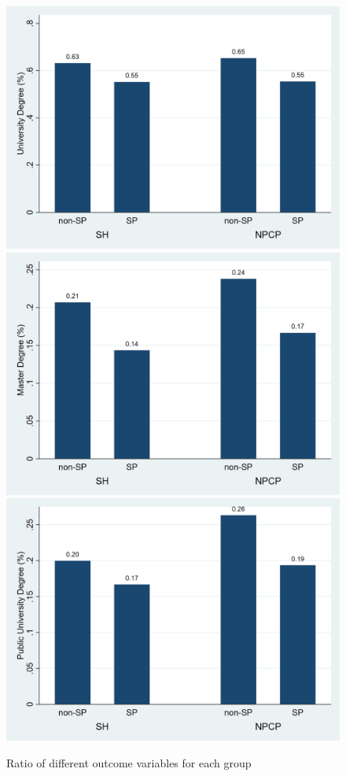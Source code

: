\documentclass[]{AEA}
\begin{document}
    \begin{figure}
        \caption{Ratio of different outcome variables for each group}
        \includegraphics[scale=0.13]{university_sp.png}
        \includegraphics[scale=0.13]{master_sp.png}
        \includegraphics[scale=0.13]{public_sp.png}
    \end{figure}
\end{document}
